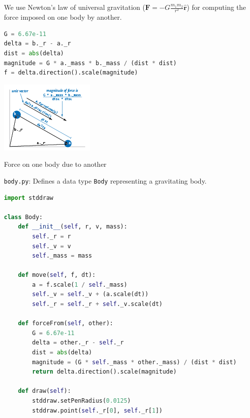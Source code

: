 \documentclass[8pt,a4paper,compress,handout]{beamer}
\begin{document}
\begin{frame}[fragile]
We use Newton's law of universal gravitation ($\mathbf{F}=-G\frac{m_1m_2}{r^2}\hat{\mathbf{r}}$) for computing the force imposed on one body by another.

\begin{lstlisting}[language=Python]
G = 6.67e-11
delta = b._r - a._r
dist = abs(delta)
magnitude = G * a._mass * b._mass / (dist * dist)
f = delta.direction().scale(magnitude)
\end{lstlisting}

\begin{center}
\includegraphics[scale=0.5]{figures/vector_force.png}

\smallskip

\tiny Force on one body due to another
\end{center}
\end{frame}

\begin{frame}[fragile]
\begin{framed}
\tiny \lstinline{body.py}: Defines a data type \lstinline{Body} representing a gravitating body.
\end{framed}

\begin{lstlisting}[language=Python]
import stddraw

class Body:
    def __init__(self, r, v, mass):
        self._r = r
        self._v = v
        self._mass = mass

    def move(self, f, dt):
        a = f.scale(1 / self._mass)
        self._v = self._v + (a.scale(dt))
        self._r = self._r + self._v.scale(dt)

    def forceFrom(self, other):
        G = 6.67e-11
        delta = other._r - self._r
        dist = abs(delta)
        magnitude = (G * self._mass * other._mass) / (dist * dist)
        return delta.direction().scale(magnitude)

    def draw(self):
        stddraw.setPenRadius(0.0125)
        stddraw.point(self._r[0], self._r[1])
\end{lstlisting}
\end{frame}
\end{document}
